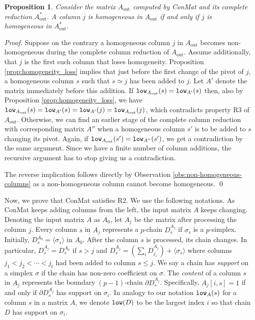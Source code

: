 \documentclass[a4paper,english,cleveref]{article}
\theoremstyle{plain}
\newtheorem{prop}{Proposition}[section]
\newcounter{li}
\DeclareMathOperator{\out}{out}
\newcommand{\compl}[1]{{#1}^*}
\newcommand{\low}{{\tt low}}
\begin{document}
\begin{prop}\label{prop:hom_coincides_with_complete_reduction}
    Consider the matrix $A_{\out}$ computed by {\sc ConMat} and its complete reduction 
    $\compl{A}_{\out}$.
    A column $j$ is homogeneous in $A_{\out}$ if and only if $j$ is homogeneous in $\compl{A}_{\out}$.
\end{prop}
\begin{proof}
    Suppose on the contrary a homogeneous column $j$ in $A_{\out}$ becomes non-homogeneous during the complete column reduction of $A_{\out}$.
    Assume additionally, that $j$ is the first such column that loses homogeneity.
    Proposition \ref{prop:homogeneity_loss} implies that just before the first change of the pivot of $j$, a homogeneous column $s$ such that $s\simeq j$ 
    has been added to $j$.
    Let $A'$ denote the matrix immediately before this addition.
    If $\low_{A_{\out}}(s)=\low_{A'}(s)$ then, also by Proposition \ref{prop:homogeneity_loss}, we have 
        $\low_{A_{\out}}(s)=\low_{A'}(s)=\low_{A'}(j)=\low_{A_{\out}}(j)$,
    which contradicts property R3 of $A_{\out}$. 
    Otherwise, we can find an earlier stage of the 
    complete column reduction with corresponding matrix $A''$ when a homogeneous column $s'$ is to be added to $s$ changing its pivot.
    Again, if $\low_{A_{\out}}(s')=\low_{A''}(s')$, we get a contradiction 
    by the same argument.
    Since we have a finite number of column additions, the 
    recursive argument has to stop giving us a contradiction.

    The reverse implication follows directly by Observation \ref{obs:non-homogeneous-columns} as a non-homogeneous column cannot become homogeneous.
    \qed
\end{proof}

Now, we prove
that {\sc ConMat} satisfies R2. We use the following notations.
As {\sc ConMat} keeps
adding columns from the left, the input matrix $A$ keeps changing. Denoting the input
matrix $A$ as $A_0$, let $A_j$ be the matrix
after processing the column $j$. 
Every column $s$ in $A_j$ represents a $p$-chain $D_s^{A_j}$ if $\sigma_s$ is a $p$-simplex. Initially, $D_s^{A_0}=\langle \sigma_s \rangle$ in $A_0$. After the column $s$ is processed, its chain changes. In particular, $D_s^{A_j}=D_s^{A_0}$ if $s> j$ and
$D_s^{A_j}=(\sum_{i}D_{j_i}^{A_j})+\langle\sigma_s\rangle$ where
columns $j_1<j_2<\cdots <j_t$ had been added to column $s\leq j$. 
We say a chain has \emph{support} on a simplex $\sigma$ if the chain has
non-zero coefficient on $\sigma$.
The \emph{content} of a column $s$ in $A_j$ represents
the boundary $(p-1)$-chain $\partial D_s^{A_j}$. Specifically, $A_j[i,s]=1$ if and only if
$\partial D_s^{A_j}$ has support on $\sigma_i$.
In analogy to our notation $\low_A(s)$ for a column $s$
in a matrix $A$, we denote $\low(D)$ to be the largest index $i$ so that
chain $D$ has support on $\sigma_i$. 
\end{document}
